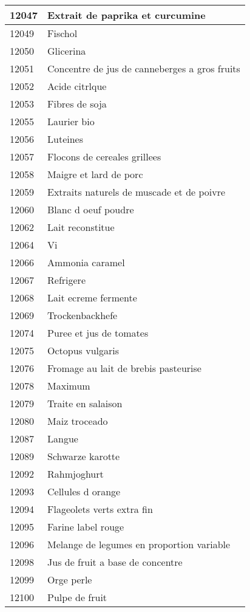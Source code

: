 \begin{longtable}{|l|l|}
12047 & Extrait de paprika et curcumine \\ \hline 
12049 & Fischol \\ \hline 
12050 & Glicerina \\ \hline 
12051 & Concentre de jus de canneberges a gros fruits \\ \hline 
12052 & Acide citrlque \\ \hline 
12053 & Fibres de soja \\ \hline 
12055 & Laurier bio \\ \hline 
12056 & Luteines \\ \hline 
12057 & Flocons de cereales grillees \\ \hline 
12058 & Maigre et lard de porc \\ \hline 
12059 & Extraits naturels de muscade et de poivre \\ \hline 
12060 & Blanc d oeuf poudre \\ \hline 
12062 & Lait reconstitue \\ \hline 
12064 & Vi \\ \hline 
12066 & Ammonia caramel \\ \hline 
12067 & Refrigere \\ \hline 
12068 & Lait ecreme fermente \\ \hline 
12069 & Trockenbackhefe \\ \hline 
12074 & Puree et jus de tomates \\ \hline 
12075 & Octopus vulgaris \\ \hline 
12076 & Fromage au lait de brebis pasteurise \\ \hline 
12078 & Maximum \\ \hline 
12079 & Traite en salaison \\ \hline 
12080 & Maiz troceado \\ \hline 
12087 & Langue \\ \hline 
12089 & Schwarze karotte \\ \hline 
12092 & Rahmjoghurt \\ \hline 
12093 & Cellules d orange \\ \hline 
12094 & Flageolets verts extra fin \\ \hline 
12095 & Farine label rouge \\ \hline 
12096 & Melange de legumes en proportion variable \\ \hline 
12098 & Jus de fruit a base de concentre \\ \hline 
12099 & Orge perle \\ \hline 
12100 & Pulpe de fruit \\ \hline 

\end{longtable}
